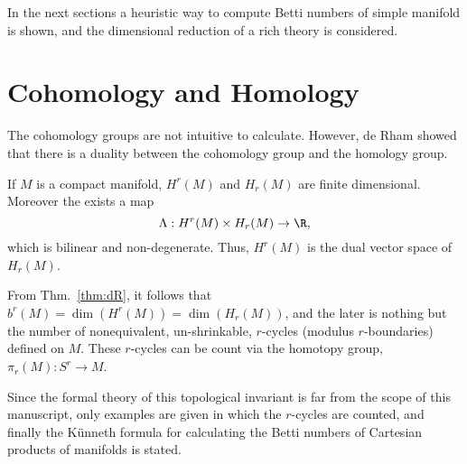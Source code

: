 In the next sections a heuristic way to compute Betti numbers of simple manifold is shown, and the dimensional reduction of a rich theory is considered.


\section{Cohomology and Homology}

The cohomology groups are not intuitive to calculate. However, de Rham showed that there is a duality between the cohomology group and the homology group.


\begin{Thm}
  \label{thm:dR}
  If $M$ is a compact manifold, $H^r (M)$ and
  $H_r (M)$ are finite dimensional. Moreover the exists a map
  \begin{equation}
    \Lambda    : H^r (M) \times H_r (M) \to \R,
  \end{equation}
  which is bilinear and non-degenerate. Thus, $H^ r (M)$ is the dual vector space of $H_r (M)$.
\end{Thm}

From Thm.~\ref{thm:dR}, it follows that $b^r(M) = \dim( H^r(M) ) = \dim( H_r(M) )$, and the later is nothing but the number of nonequivalent, un-shrinkable, $r$-cycles (modulus $r$-boundaries) defined on $M$.  These $r$-cycles can be count via the homotopy group, $\pi_r(M): S^r \to M$.


      
      

Since the formal theory of this topological invariant is far from the scope of this manuscript, only examples are given in which the $r$-cycles are counted, and finally the {K\"unneth formula} for calculating the Betti numbers of Cartesian products of manifolds is stated.

